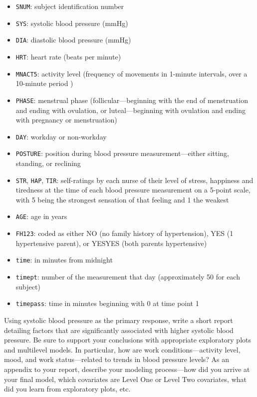 \documentclass[
]{krantz}
\providecommand{\tightlist}{%
  \setlength{\itemsep}{0pt}\setlength{\parskip}{0pt}}
\begin{document}
\begin{enumerate}
  \begin{itemize}
  \tightlist
  \item
    \texttt{SNUM}: subject identification number
  \item
    \texttt{SYS}: systolic blood pressure (mmHg)
  \item
    \texttt{DIA}: diastolic blood pressure (mmHg)
  \item
    \texttt{HRT}: heart rate (beats per minute)
  \item
    \texttt{MNACT5}: activity level (frequency of movements in 1-minute intervals, over a 10-minute period )
  \item
    \texttt{PHASE}: menstrual phase (follicular---beginning with the end of menstruation and ending with ovulation, or luteal---beginning with ovulation and ending with pregnancy or menstruation)
  \item
    \texttt{DAY}: workday or non-workday
  \item
    \texttt{POSTURE}: position during blood pressure measurement---either sitting, standing, or reclining
  \item
    \texttt{STR}, \texttt{HAP}, \texttt{TIR}: self-ratings by each nurse of their level of stress, happiness and tiredness at the time of each blood pressure measurement on a 5-point scale, with 5 being the strongest sensation of that feeling and 1 the weakest
  \item
    \texttt{AGE}: age in years
  \item
    \texttt{FH123}: coded as either NO (no family history of hypertension), YES (1 hypertensive parent), or YESYES (both parents hypertensive)
  \item
    \texttt{time}: in minutes from midnight
  \item
    \texttt{timept}: number of the measurement that day (approximately 50 for each subject)
  \item
    \texttt{timepass}: time in minutes beginning with 0 at time point 1
  \end{itemize}

  Using systolic blood pressure as the primary response, write a short report detailing factors that are significantly associated with higher systolic blood pressure. Be sure to support your conclusions with appropriate exploratory plots and multilevel models. In particular, how are work conditions---activity level, mood, and work status---related to trends in blood pressure levels? As an appendix to your report, describe your modeling process---how did you arrive at your final model, which covariates are Level One or Level Two covariates, what did you learn from exploratory plots, etc.


\end{enumerate}
\end{document}

